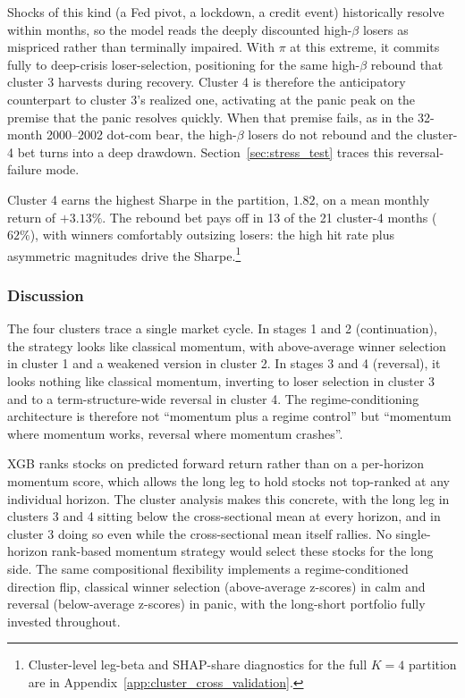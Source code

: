 Shocks of this kind (a Fed pivot, a lockdown, a credit event) historically resolve within months, so the model reads the deeply discounted high-$\beta$ losers as mispriced rather than terminally impaired. With $\pi$ at this extreme, it commits fully to deep-crisis loser-selection, positioning for the same high-$\beta$ rebound that cluster 3 harvests during recovery. Cluster 4 is therefore the anticipatory counterpart to cluster 3's realized one, activating at the panic peak on the premise that the panic resolves quickly. When that premise fails, as in the 32-month 2000--2002 dot-com bear, the high-$\beta$ losers do not rebound and the cluster-4 bet turns into a deep drawdown. Section~\ref{sec:stress_test} traces this reversal-failure mode.

Cluster 4 earns the highest Sharpe in the partition, $1.82$, on a mean monthly return of $+3.13\%$. The rebound bet pays off in 13 of the 21 cluster-4 months ($62\%$), with winners comfortably outsizing losers: the high hit rate plus asymmetric magnitudes drive the Sharpe.\footnote{Cluster-level leg-beta and SHAP-share diagnostics for the full $K=4$ partition are in Appendix~\ref{app:cluster_cross_validation}.}

\subsubsection{Discussion}\label{sec:discussion}

The four clusters trace a single market cycle. In stages 1 and 2 (continuation), the strategy looks like classical momentum, with above-average winner selection in cluster 1 and a weakened version in cluster 2. In stages 3 and 4 (reversal), it looks nothing like classical momentum, inverting to loser selection in cluster 3 and to a term-structure-wide reversal in cluster 4. The regime-conditioning architecture is therefore not ``momentum plus a regime control'' but ``momentum where momentum works, reversal where momentum crashes''.

XGB ranks stocks on predicted forward return rather than on a per-horizon momentum score, which allows the long leg to hold stocks not top-ranked at any individual horizon. The cluster analysis makes this concrete, with the long leg in clusters 3 and 4 sitting below the cross-sectional mean at every horizon, and in cluster 3 doing so even while the cross-sectional mean itself rallies. No single-horizon rank-based momentum strategy would select these stocks for the long side. The same compositional flexibility implements a regime-conditioned direction flip, classical winner selection (above-average z-scores) in calm and reversal (below-average z-scores) in panic, with the long-short portfolio fully invested throughout.

